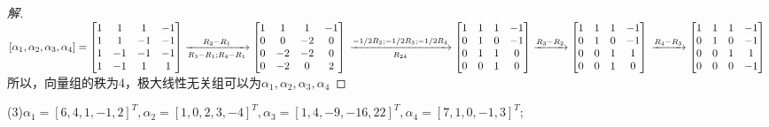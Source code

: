 \documentclass[10pt,a4paper]{report}
\begin{document}
\begin{proof}[解]
	$[\alpha_{1}, \alpha_{2}, \alpha_{3}, \alpha_{4}] = \left[
	\begin{matrix}
	1 & 1 & 1 & -1 \\
	1 & 1 & -1 & -1 \\
	1 & -1 & -1 & -1 \\
	1 & -1 & 1 & 1 
	\end{matrix}
	\right] \xrightarrow[R_{3}-R_{1};R_{4}-R_{1}]{R_{2}-R_{1}} \left[
	\begin{matrix}
	1 & 1 & 1 & -1 \\
	0 & 0 & -2 & 0 \\
	0 & -2 & -2 & 0 \\
	0 & -2 & 0 & 2 
	\end{matrix}
	\right] \\
	\xrightarrow[R_{24}]{-1/2R_{2};-1/2R_{3};-1/2R_{4}} 
	\left[
	\begin{matrix}
	1 & 1 & 1 & -1 \\
	0 & 1 & 0 & -1 \\
	0 & 1 & 1 & 0 \\
	0 & 0 & 1 & 0
	\end{matrix}
	\right] 
	\xrightarrow{R_{3}-R_{2}}
	\left[
	\begin{matrix}
	1 & 1 & 1 & -1 \\
	0 & 1 & 0 & -1 \\
	0 & 0 & 1 & 1 \\
	0 & 0 & 1 & 0
	\end{matrix}
	\right] \\
	\xrightarrow{R_{4}-R_{3}}
	\left[
	\begin{matrix}
	1 & 1 & 1 & -1 \\
	0 & 1 & 0 & -1 \\
	0 & 0 & 1 & 1 \\
	0 & 0 & 0 & -1
	\end{matrix}
	\right] \\
	$\\
	所以，向量组的秩为4，极大线性无关组可以为$\alpha_{1}, \alpha_{2}, \alpha_{3}, \alpha_{4}$
\end{proof}
\noindent (3)$\alpha_{1}=[6,4,1,-1,2]^{T}, \alpha_{2}=[1,0,2,3,-4]^{T}, \alpha_{3}=[1,4,-9,-16,22]^{T}, \alpha_{4}=[7,1,0,-1,3]^{T}$;
\end{document}
